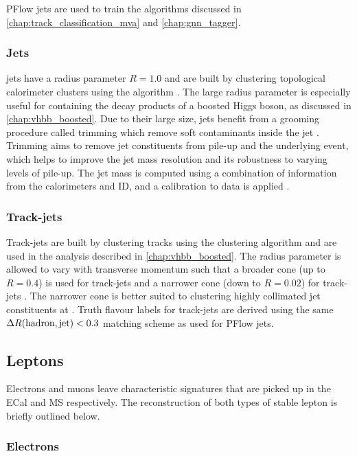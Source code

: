 PFlow jets are used to train the algorithms discussed in \cref{chap:track_classification_mva} and \cref{chap:gnn_tagger}.

\subsubsection{\texorpdfstring{\LargeR}{Large-R} Jets}
\LargeR jets have a radius parameter $R=1.0$ and are built by clustering topological calorimeter clusters using the \antikt algorithm \cite{Butterworth:2008iy}.
The large radius parameter is especially useful for containing the decay products of a boosted Higgs boson, as discussed in \cref{chap:vhbb_boosted}. 
Due to their large size, \largeR jets benefit from a grooming procedure called trimming which remove soft contaminants inside the jet \cite{ATLAS:2020jwz,ATLAS:2013bqs}.
Trimming aims to remove jet constituents from pile-up and the underlying event, which helps to improve the jet mass resolution and its robustness to varying levels of pile-up.
The jet mass is computed using a combination of information from the calorimeters and ID, and a calibration to data is applied \cite{JETM-2018-02}.


\subsubsection{Track-jets}
Track-jets are built by clustering tracks using the \antikt clustering algorithm and are used in the analysis described in \cref{chap:vhbb_boosted}.
The radius parameter is allowed to vary with transverse momentum such that a broader cone (up to $R=0.4$) is used for \lowpt track-jets and a narrower cone (down to $R=0.02$) for \highpt track-jets \cite{Krohn:2009zg,ATL-PHYS-PUB-2017-010}.
The narrower cone is better suited to clustering highly collimated jet constituents at \highpt.
Truth flavour labels for track-jets are derived using the same ${\Delta R(\text{hadron},\text{jet})<0.3}$ matching scheme as used for PFlow jets.

\subsection{Leptons}\label{sec:lepton_reco}

Electrons and muons leave characteristic signatures that are picked up in the ECal and MS respectively.
The reconstruction of both types of stable lepton is briefly outlined below.

\subsubsection{Electrons}

